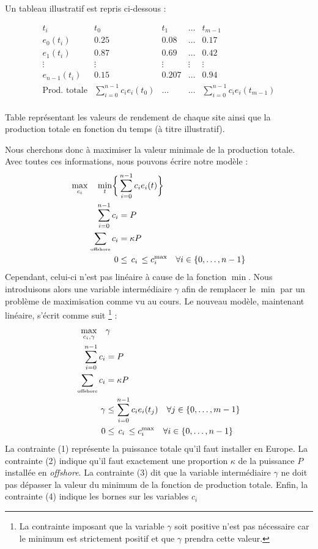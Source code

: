 \documentclass{article}
\newlength{\temp}
\begin{document}
Un tableau illustratif est repris ci-dessous :
\begin{table}[h!]
\centering
    \[ \begin{array}{c|cccc}
      t_i    & {t_0} & {t_1} & {\ldots}  & {t_{m-1}}\\
      \hline
      e_0(t_i) & 0.25       & 0.08   &\ldots    & 0.17 \\
      e_1(t_i) & 0.87       & 0.69   &\ldots    & 0.42 \\
      \vdots   & \vdots     & \vdots  &\vdots   & \vdots \\
      e_{n-1}(t_i) & 0.15       & 0.207   &\ldots    & 0.94 \\
      \hline
      \text{Prod. totale} &\scriptstyle \sum \limits_{i=0}^{n-1}c_i e_i(t_0) &\ldots &\ldots &\scriptstyle \sum \limits_{i=0}^{n-1}c_i e_i(t_{m-1})\\
    \end{array} \]
\caption{Table représentant les valeurs de rendement de chaque site ainsi que la production totale en fonction du temps (à titre illustratif).}
\label{table:table_rendement_illustratif}
\end{table}
\newpage
Nous cherchons donc à maximiser la valeur minimale de la production totale. Avec toutes ces informations, nous pouvons écrire notre modèle :
\begin{align*}
    \max_{c_i} \quad  
    \min_t  \biggl\{ &\sum_{i=0}^{n-1}c_i e_i(t) \biggl\} \\ 
    \sum_{i=0}^{n-1} c_i &= P\\
    \sum_{\text{\tiny offshore}}c_i &= \kappa P\\
    0 &\le \, c_i \, \le c_i^{\max} \quad \forall i \in \{0, \ldots, n-1\}
\end{align*}
Cependant, celui-ci n'est pas linéaire à cause de la fonction $\min$. Nous introduisons alors une variable intermédiaire $\gamma$ afin de remplacer le $\min$ par un problème de maximisation comme vu au cours. Le nouveau modèle, maintenant linéaire, s'écrit comme suit \footnote{La contrainte imposant que la variable $\gamma$ soit positive n'est pas nécessaire car le minimum est strictement positif et que $\gamma$ prendra cette valeur.} :
\begin{align}
    \max_{c_i, \gamma} \quad &\gamma \nonumber \\ 
    \sum_{i=0}^{n-1} c_i &= P\\
    \sum_{\text{\tiny offshore}}c_i &= \kappa P\\
    \gamma &\le \sum_{i=0}^{n-1} c_i e_i(t_j) \quad \forall j \in \{0, \ldots, m-1\}\\
    0 &\le \, c_i \, \le c_i^{\max} \quad \forall i \in \{0, \ldots, n-1\}
\end{align}
La contrainte (1) représente la puissance totale qu'il faut installer en Europe. La contrainte (2) indique qu'il faut exactement une proportion $\kappa$ de la puissance $P$ installée en \textit{offshore}. La contrainte (3) dit que la variable intermédiaire $\gamma$ ne doit pas dépasser la valeur du minimum de la fonction de production totale. Enfin, la contrainte (4) indique les bornes sur les variables $c_i$
\end{document}

